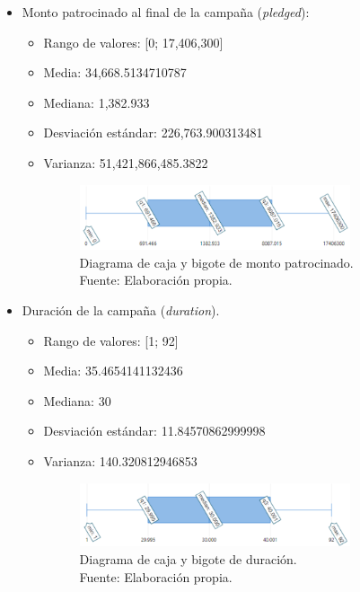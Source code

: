 \begin{itemize}
\begin{itemize}
\begin{figure}[!ht]
\begin{center}
{					Fuente: Elaboración propia.}
				\label{4:fig17}
			\end{center}
		\end{figure}
	\end{itemize}
	\item Monto patrocinado al final de la campaña (\textit{pledged}):
	\begin{itemize}
		\item Rango de valores: [0; 17,406,300]
		\item Media: 34,668.5134710787
		\item Mediana: 1,382.933
		\item Desviación estándar: 226,763.900313481
		\item Varianza: 51,421,866,485.3822
		\begin{figure}[!ht]
			\begin{center}
				\includegraphics[width=0.80\textwidth]{4/figures/caja_bigote_pledged.png}
				\caption[Diagrama de caja y bigote de monto patrocinado]{Diagrama de caja y bigote de monto patrocinado.\\
					Fuente: Elaboración propia.}
				\label{4:fig18}
			\end{center}
		\end{figure}
	\end{itemize}
	\item Duración de la campaña (\textit{duration}).
	\begin{itemize}
		\item Rango de valores: [1; 92]
		\item Media: 35.4654141132436
		\item Mediana: 30
		\item Desviación estándar: 11.84570862999998
		\item Varianza: 140.320812946853
		\begin{figure}[!ht]
			\begin{center}
				\includegraphics[width=0.80\textwidth]{4/figures/caja_bigote_duration.png}
				\caption[Diagrama de caja y bigote de duración]{Diagrama de caja y bigote de duración.\\
					Fuente: Elaboración propia.}
				\label{4:fig19}
			\end{center}
		\end{figure}
	\end{itemize}
\end{itemize}

